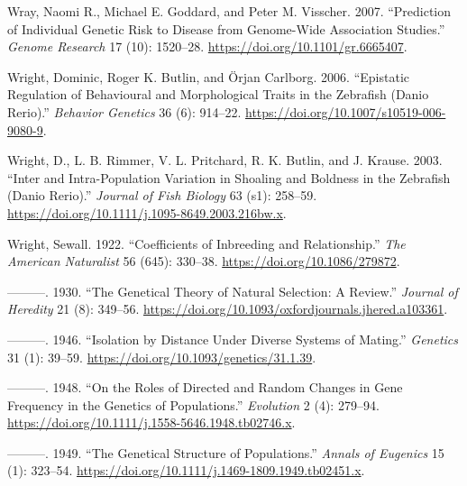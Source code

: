 \documentclass[
]{book}
\newlength{\cslhangindent}
\newlength{\cslentryspacingunit} %
\newenvironment{CSLReferences}[2] %
 {%
  \setlength{\parindent}{0pt}
  \ifodd #1
  \let\oldpar\par
  \def\par{\hangindent=\cslhangindent\oldpar}
  \fi
  \setlength{\parskip}{#2\cslentryspacingunit}
 }%
 {}
\begin{document}
\begin{CSLReferences}{1}{0}
\leavevmode{}%
Wray, Naomi R., Michael E. Goddard, and Peter M. Visscher. 2007. {``Prediction of Individual Genetic Risk to Disease from Genome-Wide Association Studies.''} \emph{Genome Research} 17 (10): 1520--28. \url{https://doi.org/10.1101/gr.6665407}.

\leavevmode{}%
Wright, Dominic, Roger K. Butlin, and Örjan Carlborg. 2006. {``Epistatic Regulation of Behavioural and Morphological Traits in the Zebrafish ({Danio} Rerio).''} \emph{Behavior Genetics} 36 (6): 914--22. \url{https://doi.org/10.1007/s10519-006-9080-9}.

\leavevmode{}%
Wright, D., L. B. Rimmer, V. L. Pritchard, R. K. Butlin, and J. Krause. 2003. {``Inter and Intra-Population Variation in Shoaling and Boldness in the Zebrafish ({Danio} Rerio).''} \emph{Journal of Fish Biology} 63 (s1): 258--59. \url{https://doi.org/10.1111/j.1095-8649.2003.216bw.x}.

\leavevmode{}%
Wright, Sewall. 1922. {``Coefficients of {Inbreeding} and {Relationship}.''} \emph{The American Naturalist} 56 (645): 330--38. \url{https://doi.org/10.1086/279872}.

\leavevmode{}%
---------. 1930. {``The {Genetical Theory} of {Natural Selection}: {A Review}.''} \emph{Journal of Heredity} 21 (8): 349--56. \url{https://doi.org/10.1093/oxfordjournals.jhered.a103361}.

\leavevmode{}%
---------. 1946. {``Isolation by {Distance} Under {Diverse Systems} of {Mating}.''} \emph{Genetics} 31 (1): 39--59. \url{https://doi.org/10.1093/genetics/31.1.39}.

\leavevmode{}%
---------. 1948. {``On the {Roles} of {Directed} and {Random Changes} in {Gene Frequency} in the {Genetics} of {Populations}.''} \emph{Evolution} 2 (4): 279--94. \url{https://doi.org/10.1111/j.1558-5646.1948.tb02746.x}.

\leavevmode{}%
---------. 1949. {``The {Genetical Structure} of {Populations}.''} \emph{Annals of Eugenics} 15 (1): 323--54. \url{https://doi.org/10.1111/j.1469-1809.1949.tb02451.x}.


\end{CSLReferences}
\end{document}
